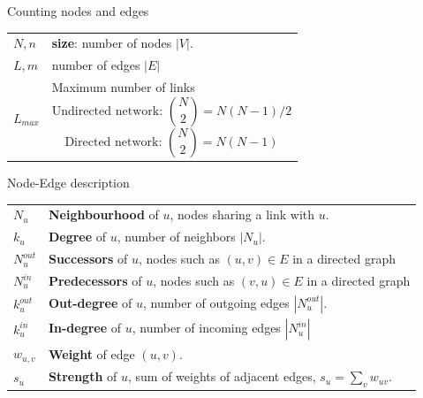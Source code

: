 \documentclass[a4paper,11pt]{book}
\begin{document}
\begin{textbox}{Counting nodes and edges}

\begin{tabular}{p{}|p{}}\scriptsize
$N,n$ & \textbf{size}: number of nodes $|V|$.  \\

$L,m$ & number of edges $|E|$\\
$L_{max}$ & Maximum number of links
\[  \text{Undirected network: } {N\choose 2 }=N(N-1)/2
\]
\[
 \text{Directed network: } {N\choose 2 }=N(N-1)
\]

\end{tabular}

\end{textbox}










\begin{textbox}{Node-Edge description}
\begin{tabular}{p{}|p{}}\scriptsize

$N_u$ & \textbf{Neighbourhood} of $u$, nodes sharing a link with $u$. \\


$k_u$ & \textbf{Degree} of $u$, number of neighbors $|N_u|$. \\
\hline
$N^{out}_u$ & \textbf{Successors} of $u$, nodes such as $(u,v)\in E$ in a directed graph \\

$N^{in}_u$ & \textbf{Predecessors} of $u$, nodes such as $(v,u)\in E$ in a directed graph \\

$k^{out}_u$ & \textbf{Out-degree} of $u$, number of outgoing edges  $|N^{out}_u|$. \\

$k^{in}_u$ & \textbf{In-degree} of $u$, number of incoming edges $|N^{in}_u|$ \\

\hline

$w_{u,v}$ & \textbf{Weight} of edge $(u,v)$. \\

$s_u$ & \textbf{Strength} of $u$, sum of weights of adjacent edges, $s_u = \sum_v w_{uv}$. \\
\end{tabular}

\end{textbox}
\end{document}
